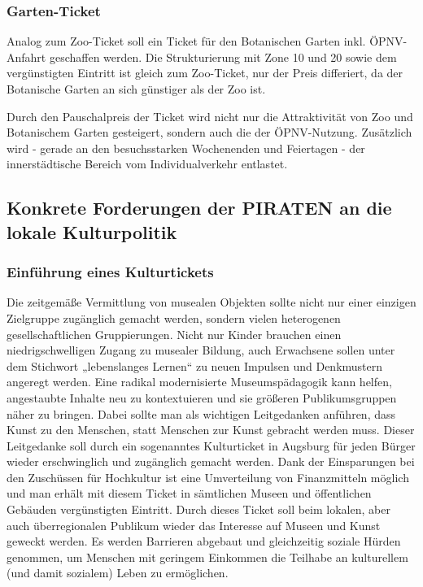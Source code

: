 \documentclass[a5paper, ngerman, 10pt]{scrbook}
\begin{document}
   \subsubsection{Garten-Ticket}
   
   Analog zum Zoo-Ticket soll ein Ticket für den Botanischen Garten inkl. 
   ÖPNV-Anfahrt geschaffen werden. Die Strukturierung mit Zone 10 und 20 sowie 
   dem vergünstigten Eintritt ist gleich zum Zoo-Ticket, nur der Preis 
   differiert, da der Botanische Garten an sich günstiger als der Zoo ist.
   
   Durch den Pauschalpreis der Ticket wird nicht nur die Attraktivität von Zoo 
   und Botanischem Garten gesteigert, sondern auch die der ÖPNV-Nutzung. 
   Zusätzlich wird - gerade an den besuchsstarken Wochenenden und Feiertagen - 
   der innerstädtische Bereich vom Individualverkehr entlastet.
   
   \subsection{Konkrete Forderungen der PIRATEN an die lokale Kulturpolitik}
   
   \subsubsection{Einführung eines Kulturtickets}
   
   Die zeitgemäße Vermittlung von musealen Objekten sollte nicht nur einer 
   einzigen Zielgruppe zugänglich gemacht werden, sondern vielen heterogenen 
   gesellschaftlichen Gruppierungen. Nicht nur Kinder brauchen einen 
   niedrigschwelligen Zugang zu musealer Bildung, auch Erwachsene sollen unter 
   dem Stichwort „lebenslanges Lernen“ zu neuen Impulsen und Denkmustern 
   angeregt werden. Eine radikal modernisierte Museumspädagogik kann helfen, 
   angestaubte Inhalte neu zu kontextuieren und sie größeren Publikumsgruppen 
   näher zu bringen. Dabei sollte man als wichtigen Leitgedanken anführen, 
   dass Kunst zu den Menschen, statt Menschen zur Kunst gebracht werden muss. 
   Dieser Leitgedanke soll durch ein sogenanntes Kulturticket in Augsburg für 
   jeden Bürger wieder erschwinglich und zugänglich gemacht werden. Dank der 
   Einsparungen bei den Zuschüssen für Hochkultur ist eine Umverteilung von 
   Finanzmitteln möglich und man erhält mit diesem Ticket in sämtlichen Museen 
   und öffentlichen Gebäuden vergünstigten Eintritt. Durch dieses Ticket soll 
   beim lokalen, aber auch überregionalen Publikum wieder das Interesse auf 
   Museen und Kunst geweckt werden. Es werden Barrieren abgebaut und 
   gleichzeitig soziale Hürden genommen, um Menschen mit geringem Einkommen 
   die Teilhabe an kulturellem (und damit sozialem) Leben zu ermöglichen.
   
\end{document}

